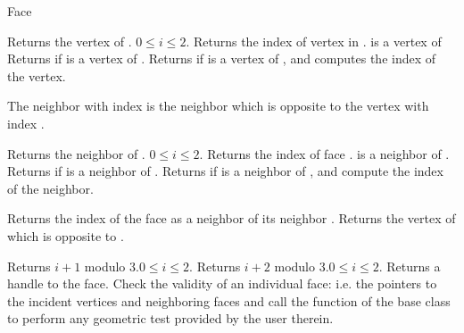 \begin{ccClass} {Face}

{Returns  the vertex  of \ccVar.
\ccPrecond $0\leq i \leq 2$.}
\ccGlue
{}
{Returns the index of vertex  in \ccVar. \ccPrecond {} is
a vertex of \ccVar}
\ccGlue
{}
{Returns  if   is a vertex of \ccVar.}
\ccGlue
{}
{Returns  if   is a vertex of \ccVar, and
 computes the index  of the vertex.}




The neighbor with index  is the neighbor which is opposite
to the vertex with index .


{Returns  the neighbor  of \ccVar.
\ccPrecond $0\leq i \leq 2$.
}
\ccGlue
{}
{Returns the index of face .
\ccPrecond {} is a neighbor of \ccVar.}
\ccGlue
{}
{Returns  if  is a neighbor of \ccVar.}
\ccGlue
{}
{Returns  if  is a neighbor of \ccVar,  and
compute the index  of the neighbor.}

{Returns the index of the face  as a neighbor
of its neighbor .}
{Returns the vertex of 
which is opposite to .}



 
{Returns $i+1$ modulo 3.\ccPrecond $0\leq i \leq 2$.}
\ccGlue
{}
{Returns $i+2$ modulo 3.\ccPrecond $0\leq i \leq 2$.}
\ccGlue
{}
{Returns a handle to the face.}
\ccGlue
{} 
{Check the validity of an individual face:
i.e. the pointers to the incident vertices
and neighboring faces
 and call the 
function of the base class to perform any geometric test provided by the user
therein.}

\end{ccClass}


